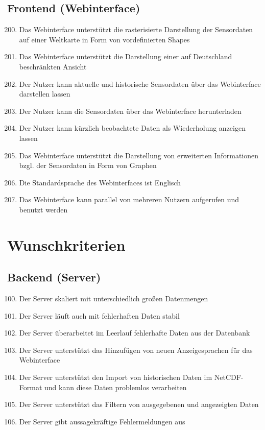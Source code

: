 \subsection{Frontend (Webinterface)}
\begin{enumerate}[label=\textbf{MK\arabic{enumi}0}]
	\setcounter{enumi}{199}
	\item Das Webinterface unterstützt die rasterisierte Darstellung der Sensordaten auf einer Weltkarte in Form von vordefinierten Shapes
	\item Das Webinterface unterstützt die Darstellung einer auf Deutschland beschränkten Ansicht
	\item Der Nutzer kann aktuelle und historische Sensordaten über das Webinterface darstellen lassen
	\item Der Nutzer kann die Sensordaten über das Webinterface herunterladen
	\item Der Nutzer kann kürzlich beobachtete Daten als Wiederholung anzeigen lassen
	\item Das Webinterface unterstützt die Darstellung von erweiterten Informationen bzgl. der Sensordaten in Form von Graphen
	\item Die Standardsprache des Webinterfaces ist Englisch
	\item Das Webinterface kann parallel von mehreren Nutzern aufgerufen und benutzt werden
\end{enumerate}

\section{Wunschkriterien}
\subsection{Backend (Server)}
\begin{enumerate}[label=\textbf{WK\arabic{enumi}0}]
	\setcounter{enumi}{99}
	\item Der Server skaliert mit unterschiedlich großen Datenmengen
	\item Der Server läuft auch mit fehlerhaften Daten stabil
	\item Der Server überarbeitet im Leerlauf fehlerhafte Daten aus der Datenbank
	\item Der Server unterstützt das Hinzufügen von neuen Anzeigesprachen für das Webinterface
	\item \label{NetCDF_Import}Der Server unterstützt den Import von historischen Daten im NetCDF-Format und kann diese Daten problemlos verarbeiten
	\item Der Server unterstützt das Filtern von ausgegebenen und angezeigten Daten
	\item Der Server gibt aussagekräftige Fehlermeldungen aus
\end{enumerate}
